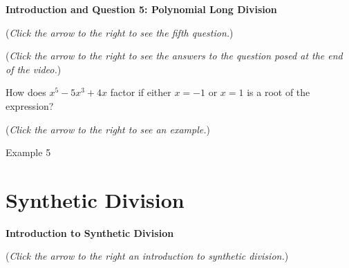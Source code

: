 \documentclass{ximera}
\begin{document}
\textbf{Introduction and Question 5: Polynomial Long Division}
\begin{question}
\begin{flushright}
{\color{blue}(\emph{Click the arrow to the right to see the fifth question.})}
\end{flushright}
\begin{center}
\begin{expandable}
{\color{blue}(\emph{Click the arrow to the right to see the answers 
to the question posed at the end of the video.})}
\begin{expandable}
How does $x^5 - 5x^3 + 4x$ factor if either $x=-1$ or $x=1$ is a root of the expression?
\begin{multipleChoice}
\end{multipleChoice}
\begin{flushright}
{\color{blue}(\emph{Click the arrow to the right to see an example.})}
\end{flushright}
\begin{expandable}
Example 5
\end{expandable}
\end{expandable}
\end{expandable}
\end{center}
\end{question}


\section{Synthetic Division}

\textbf{Introduction to Synthetic Division}
\begin{explanation}
{\color{blue}(\emph{Click the arrow to the right an introduction to 
synthetic division.})}
\begin{expandable}
\end{expandable}
\end{explanation}
\end{document}
